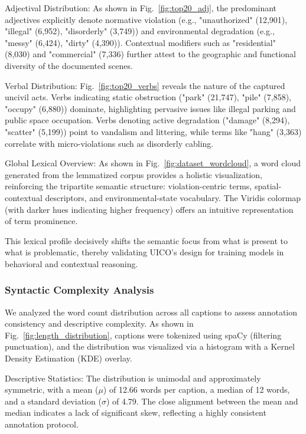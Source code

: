 \documentclass[lettersize,journal]{IEEEtran}
\begin{document}
	Adjectival Distribution: As shown in Fig.~\ref{fig:top20_adj}, the predominant adjectives explicitly denote normative violation (e.g., "unauthorized" (12,901), "illegal" (6,952), "disorderly" (3,749)) and environmental degradation (e.g., "messy" (6,424), "dirty" (4,390)). Contextual modifiers such as "residential" (8,030) and "commercial" (7,336) further attest to the geographic and functional diversity of the documented scenes.
	
	Verbal Distribution: Fig.~\ref{fig:top20_verbs} reveals the nature of the captured uncivil acts. Verbs indicating static obstruction ("park" (21,747), "pile" (7,858), "occupy" (6,880)) dominate, highlighting pervasive issues like illegal parking and public space occupation. Verbs denoting active degradation ("damage" (8,294), "scatter" (5,199)) point to vandalism and littering, while terms like "hang" (3,363) correlate with micro-violations such as disorderly cabling.
	
	Global Lexical Overview:  As shown in Fig.~\ref{fig:dataset_wordcloud}, a word cloud generated from the lemmatized corpus provides a holistic visualization, reinforcing the tripartite semantic structure: violation-centric terms, spatial-contextual descriptors, and environmental-state vocabulary. The Viridis colormap (with darker hues indicating higher frequency) offers an intuitive representation of term prominence.
	
	This lexical profile decisively shifts the semantic focus from what is present to what is problematic, thereby validating UICO's design for training models in behavioral and contextual reasoning.
	
	\subsubsection{Syntactic Complexity Analysis}
	We analyzed the word count distribution across all captions to assess annotation consistency and descriptive complexity. As shown in Fig.~\ref{fig:length_distribution}, captions were tokenized using spaCy (filtering punctuation), and the distribution was visualized via a histogram with a Kernel Density Estimation (KDE) overlay.
	
	Descriptive Statistics: The distribution is unimodal and approximately symmetric, with a mean ($\mu$) of 12.66 words per caption, a median of 12 words, and a standard deviation ($\sigma$) of 4.79. The close alignment between the mean and median indicates a lack of significant skew, reflecting a highly consistent annotation protocol.
	
\end{document}
